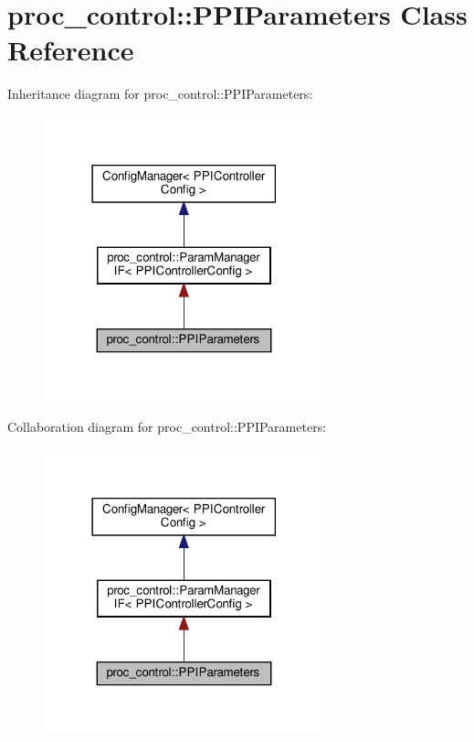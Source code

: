 \hypertarget{classproc__control_1_1_p_p_i_parameters}{}\section{proc\+\_\+control\+:\+:P\+P\+I\+Parameters Class Reference}
\label{classproc__control_1_1_p_p_i_parameters}


Inheritance diagram for proc\+\_\+control\+:\+:P\+P\+I\+Parameters\+:\nopagebreak
\begin{figure}[H]
\begin{center}
\leavevmode
\includegraphics[width=230pt]{classproc__control_1_1_p_p_i_parameters__inherit__graph}
\end{center}
\end{figure}


Collaboration diagram for proc\+\_\+control\+:\+:P\+P\+I\+Parameters\+:\nopagebreak
\begin{figure}[H]
\begin{center}
\leavevmode
\includegraphics[width=230pt]{classproc__control_1_1_p_p_i_parameters__coll__graph}
\end{center}
\end{figure}
